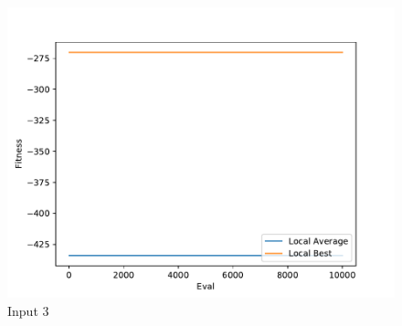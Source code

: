 \documentclass{standalone}
\begin{document}
\begin{figure}[!htb]
	\caption{Input 3}
	\label{fig:graph_3019}
	\includegraphics[width=\textwidth]{../graphs/graphs/3019.pdf}
\end{figure}
\end{document}

